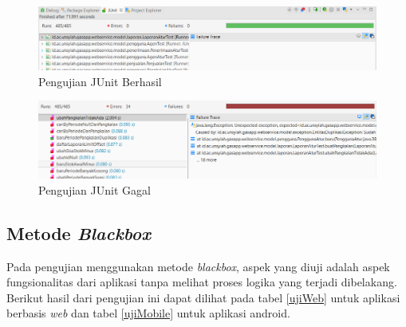 			\begin{figure}[H]
				\center
				\includegraphics [width = 14cm]{gambar/kode/junit-success}
				\caption{Pengujian JUnit Berhasil}
				\label{junitSuccess}
			\end{figure}
		
			\begin{figure}[H]
				\center
				\includegraphics [width = 14cm]{gambar/kode/junit-fail}
				\caption{Pengujian JUnit Gagal}
				\label{junitFail}
			\end{figure}
	
	
	\subsection{Metode \textit{Blackbox}}
	
	Pada pengujian menggunakan metode \textit{blackbox}, aspek yang diuji adalah aspek fungsionalitas dari aplikasi tanpa melihat proses logika yang terjadi dibelakang. Berikut hasil dari pengujian ini dapat dilihat pada tabel \ref{ujiWeb} untuk aplikasi berbasis \textit{web} dan tabel \ref{ujiMobile} untuk aplikasi android.
	
